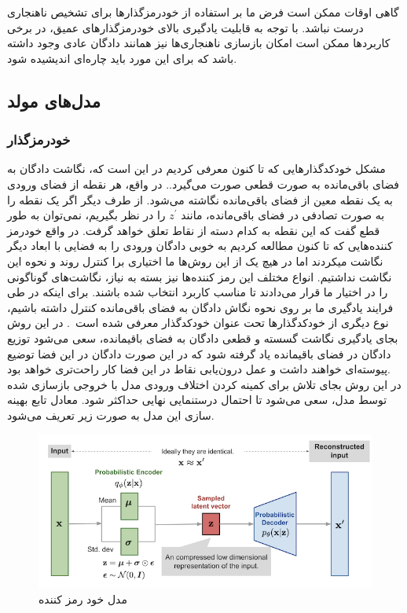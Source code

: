 \documentclass[12pt,a4paper]{report}
\theoremstyle{definition}
\theoremstyle{definition}
\begin{document}
گاهی اوقات ممکن است فرض ما بر استفاده از خودرمزگذار‌ها برای تشخیص ناهنجاری درست نباشد. با توجه به قابلیت یادگیری بالای خودرمزگذار‌های عمیق، در برخی کاربرد‌ها ممکن است امکان بازسازی ناهنجاری‌ها نیز همانند دادگان عادی وجود داشته باشد که برای این مورد باید چاره‌ای اندیشیده شود\cite{https://doi.org/10.48550/arxiv.1904.02639}. 

\subsection{مدل‌های مولد}

\subsubsection{ خودرمزگذار }
مشکل خودکدگذار‌هایی که تا کنون معرفی کردیم در این است که، نگاشت دادگان به فضای باقی‌مانده به صورت قطعی صورت می‌گیرد.. در واقع، هر نقطه از فضای ورودی به یک نقطه معین از فضای باقی‌مانده نگاشته می‌شود. از طرف دیگر اگر یک نقطه را به صورت تصادفی در فضای باقی‌مانده، مانند 
$z^{'}$
 را در نظر بگیریم، نمی‌توان به طور قطع گفت که این نقطه به کدام دسته از نقاط تعلق خواهد گرفت. در واقع خودرمز کننده‌هایی که تا کنون مطالعه کردیم به خوبی دادگان ورودی را به فضایی با ابعاد دیگر نگاشت میکردند اما در هیچ یک از این روش‌ها ما اختیاری برا کنترل روند و نحوه این نگاشت نداشتیم. انواع مختلف این رمز کننده‌ها نیز بسته به نیاز، نگاشت‌های گوناگونی را در اختیار ما قرار می‌دادند تا مناسب کاربرد انتخاب شده باشند. برای اینکه در طی فرایند یادگیری ما بر روی نحوه نگاش دادگان به فضای باقی‌مانده کنترل داشته باشیم، نوع دیگری از خودکدگذار‌ها تحت عنوان خودکدگذار  معرفی شده است~\cite{vae}. در این روش بجای یادگیری نگاشت گسسته و قطعی دادگان به فضای باقیمانده، سعی می‌شود توزیع دادگان در فضای باقیمانده یاد گرفته شود که در این صورت دادگان در این فضا توضیع پیوسته‌ای خواهند داشت و عمل درون‌یابی نقاط در این فضا کار راحت‌تری خواهد بود.\\

در این روش بجای تلاش برای کمینه کردن اختلاف ورودی مدل با خروجی بازسازی شده توسط مدل، سعی می‌شود تا احتمال درستنمایی نهایی حداکثر شود. معادل تابع بهینه سازی این مدل به صورت زیر تعریف می‌شود.
\begin{figure}[!h]
	\begin{center}
		\includegraphics[width=0.7\linewidth]{./images/figures/vae.png}
	\end{center}
	\caption{مدل خود رمز کننده }
	\label{fig:vae}
	\centering
\end{figure}
\end{document}

